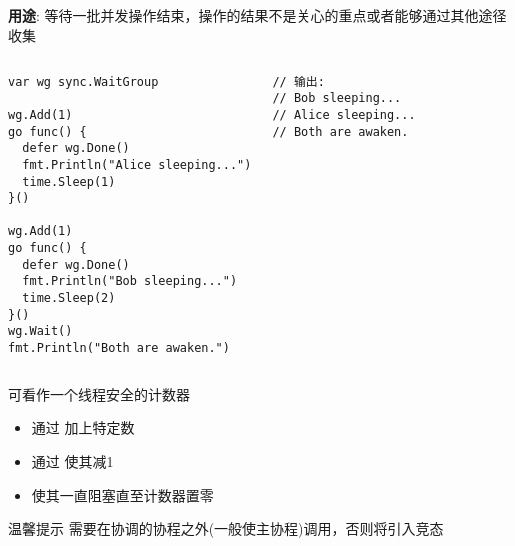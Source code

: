 \subsection{\WaitGroup}
\begin{frame}[fragile]{\WaitGroup}
   \textbf{用途}: 等待一批并发操作结束，\alert{操作的结果不是关心的重点或者能够通过其他途径收集} 

   \begin{columns}[t]
\begin{lstlisting}[xleftmargin=8pt]
var wg sync.WaitGroup

wg.Add(1)
go func() {
  defer wg.Done()
  fmt.Println("Alice sleeping...")
  time.Sleep(1)
}()

wg.Add(1)
go func() {
  defer wg.Done()
  fmt.Println("Bob sleeping...")
  time.Sleep(2)
}()
wg.Wait()
fmt.Println("Both are awaken.")
\end{lstlisting}

\begin{lstlisting}[firstnumber=last,xleftmargin=16pt]
// 输出:
// Bob sleeping...
// Alice sleeping...
// Both are awaken.
\end{lstlisting}
   \end{columns}
\end{frame}

\begin{frame}{\WaitGroup}
    \WaitGroup 可看作一个线程安全的计数器

    \begin{itemize}
        \item 通过 加上特定数
        \item 通过 使其减1
        \item {}使其一直阻塞直至计数器置零
    \end{itemize}

    \begin{alertblock}{温馨提示}
        需要在\WaitGroup 协调的协程之外(一般使主协程)调用，否则将引入\alert{竞态}
    \end{alertblock}
\end{frame}